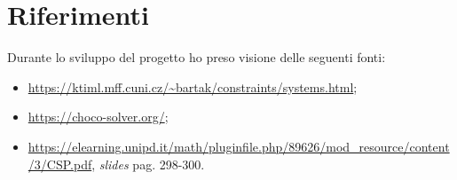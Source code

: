 \newpage
\section{Riferimenti}
Durante lo sviluppo del progetto ho preso visione delle seguenti fonti:
\begin{itemize}
\item \url{https://ktiml.mff.cuni.cz/~bartak/constraints/systems.html};
\item \url{https://choco-solver.org/};
\item \url{https://elearning.unipd.it/math/pluginfile.php/89626/mod_resource/content/3/CSP.pdf},
\textit{slides} pag. 298-300.
\end{itemize}
